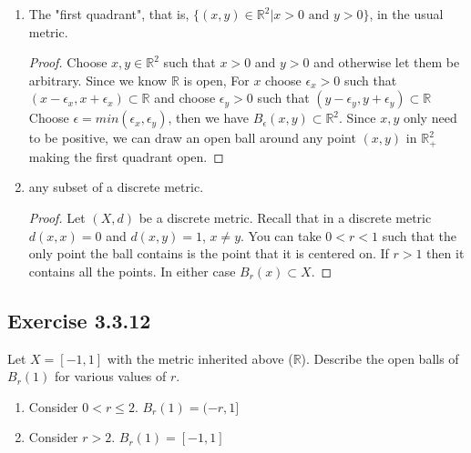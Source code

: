 \documentclass{tufte-book}
\theoremstyle{mytheoremstyle}
\theoremstyle{mylemstyle}
\theoremstyle{mydefstyle}
\begin{document}
\begin{enumerate}
\item The "first quadrant", that is, $\{(x,y) \in \mathbb{R}^2 | x > 0 \text{ and } y > 0 \}$, in the usual metric.

\begin{proof}
Choose $x, y \in \mathbb{R}^2$ such that $x > 0$ and $y > 0$ and otherwise let them be arbitrary.    Since we know $\mathbb{R}$ is open, For $x$ choose $\epsilon_x > 0$ such that $(x-\epsilon_x, x+\epsilon_x) \subset \mathbb{R}$ and choose $\epsilon_y >0$ such that $(y-\epsilon_y, y+\epsilon_y) \subset \mathbb{R}$   Choose $\epsilon = min(\epsilon_x, \epsilon_y)$, then we have $B_\epsilon(x,y) \subset \mathbb{R}^2$.  Since $x,y$ only need to be positive, we can draw an open ball around any point $(x,y)$ in $\mathbb{R}_+^2$ making the first quadrant open.
\end{proof}

\item any subset of a discrete metric.

\begin{proof}
Let $(X, d)$ be a discrete metric.  Recall that in a discrete metric $d(x,x) = 0$ and $d(x,y)=1$, $x \neq y$.   You can take $0<r<1$ such that the only point the ball contains is the point that it is centered on.  If $r>1$ then it contains all the points.  In either case $B_r(x) \subset X$.
\end{proof}
\end{enumerate}

\subsection{Exercise 3.3.12}
Let $X = [-1,1]$ with the metric inherited above ($\mathbb{R}$).  Describe the open balls of $B_r(1)$ for various values of $r$.

\begin{enumerate}

\item Consider $0< r \leq 2$.  $B_r(1) = (-r, 1]$
\item Consider $r > 2$. $B_r(1) = [-1,1]$ 
\end{enumerate}
\end{document}
